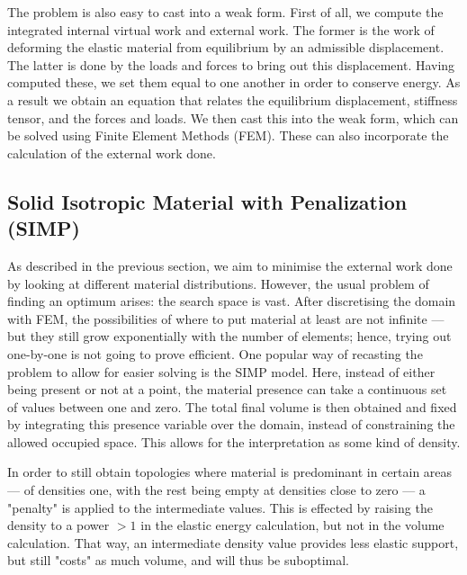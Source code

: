 The problem is also easy to cast into a weak form. First of all, we compute the integrated internal virtual work and external work. The former is the work of deforming the elastic material from equilibrium by an admissible displacement. The latter is done by the loads and forces to bring out this displacement. Having computed these, we set them equal to one another in order to conserve energy. As a result we obtain an equation that relates the equilibrium displacement, stiffness tensor, and the forces and loads. We then cast this into the weak form, which can be solved using Finite Element Methods (FEM). These can also incorporate the calculation of the external work done.

\subsection{Solid Isotropic Material with Penalization (SIMP)}
As described in the previous section, we aim to minimise the external work done by looking at different material distributions. However, the usual problem of finding an optimum arises: the search space is vast. After discretising the domain with FEM, the possibilities of where to put material at least are not infinite --- but they still grow exponentially with the number of elements; hence, trying out one-by-one is not going to prove efficient. One popular way of recasting the problem to allow for easier solving is the SIMP model. Here, instead of either being present or not at a point, the material presence can take a continuous set of values between one and zero. The total final volume is then obtained and fixed by integrating this presence variable over the domain, instead of constraining the allowed occupied space. This allows for the interpretation as some kind of density.

In order to still obtain topologies where material is predominant in certain areas --- of densities one, with the rest being empty at densities close to zero --- a "penalty" is applied to the intermediate values. This is effected by raising the density to a power $> 1$ in the elastic energy calculation, but not in the volume calculation. That way, an intermediate density value provides less elastic support, but still "costs" as much volume, and will thus be suboptimal. 

